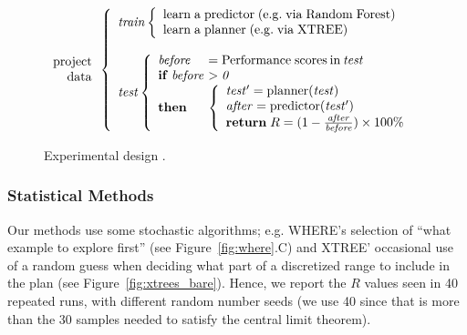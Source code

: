 \documentclass{sig-alternate}
\newcommand{\fig}[1]{Figure~\ref{fig:#1}}
\begin{document}
\begin{figure}[!t]
{\small 
\[
\begin{array}{r} 
\mathrm{project}\\
\mathrm{data}
\end{array} 
\left\{\begin{array}{l}\mathit{train}
        \left\{\begin{array}{l}
                \mathrm{learn\;a\;}\mathrm{predictor\;}\mathrm{(e.g.\;via \;Random\;Forest)}\\
                \mathrm{learn\;a\;}\mathrm{planner\;}\mathrm{(e.g.\;via \; XTREE)}
              \end{array}\right.
       \\
      ~\\
\mathit{test}  
    \left\{\begin{array}{l@{~}l}
           \mathit{before}& =\mathrm{Performance\; scores \hspace{2pt} in \hspace{2pt}}\mathit{test}\\
           \mathrm{\bf if\;}\mathit{before} & >  \mathit{0}\\
           \mathrm{\bf then} &
           \left\{
            \begin{array}{l}
                \mathit{test'} = \mathrm{planner}(\mathit{test})\\
                \mathit{after} =\mathrm{predictor}(\mathit{test'})\\ 
                \mathrm{{\bf return}\;} R=(1-\frac{\mathit{after}}{\mathit{before}})\times 100 \%
            \end{array}
          \right.
   \end{array}\right.
\end{array} \right. 
\]}
 \caption{Experimental design .}\label{fig:design}
 \end{figure}



\subsubsection{Statistical Methods}
Our methods use some stochastic algorithms; e.g. WHERE's selection of ``what example to explore first'' (see \fig{where}.C) and XTREE' occasional use of a random guess when deciding what part of a discretized range to include in the plan (see \fig{xtrees_bare}). Hence, we report the $R$ values seen in 40 repeated runs, with different random number seeds (we use 40 since that is  more than the 30 samples  needed to satisfy the central limit theorem).
\end{document}
